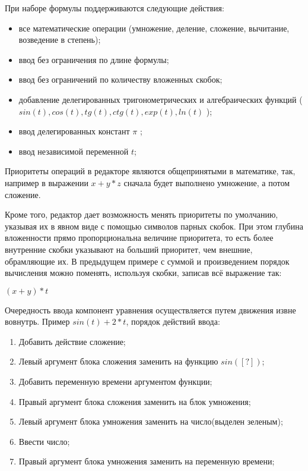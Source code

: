 При наборе формулы поддерживаются следующие действия:
\begin{itemize}
\item{все математические операции (умножение, деление, сложение, вычитание, возведение в степень);}
\item{ввод без ограничения по длине формулы;}
\item{ввод без ограничений по количеству вложенных скобок;}
\item{добавление делегированных тригонометрических и алгебраических функций ($sin(t), cos(t), tg(t), ctg(t), exp(t), ln(t)$ );}
\item{ввод делегированных констант $\pi$ ;}
\item{ввод независимой переменной $t$;}
\end{itemize}

Приоритеты операций в редакторе являются общепринятыми в математике, так, например в выражении $x+y*z$ сначала будет выполнено умножение, а потом сложение. 
	
Кроме того, редактор дает возможность менять приоритеты по умолчанию, указывая их в явном виде с помощью символов парных скобок. При этом глубина вложенности прямо пропорциональна величине приоритета, то есть более внутренние скобки указывают на больший приоритет, чем внешние, обрамляющие их. В предыдущем примере с суммой и произведением порядок вычисления можно поменять, используя скобки, записав всё выражение так:  

\begin{center}
$(x+y)*t$
\end{center}

Очередность ввода компонент уравнения осуществляется путем движения извне вовнутрь. 
Пример  $sin(t)+2*t$, порядок действий ввода:
\begin{enumerate}
\item{Добавить действие сложение;}
\item{Левый аргумент блока сложения заменить на функцию $sin([?])$;}
\item{Добавить переменную времени аргументом функции;}
\item{Правый аргумент блока сложения заменить на блок умножения;}
\item{Левый аргумент блока умножения заменить на число(выделен зеленым);}
\item{Ввести число;}
\item{Правый аргумент блока умножения заменить на переменную времени;}
\end{enumerate}
	
